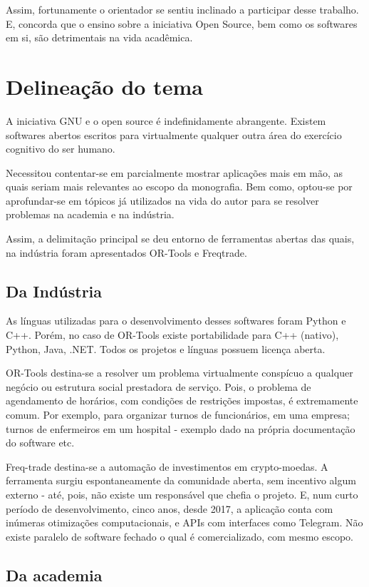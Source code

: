 \documentclass[
12pt,				%
openright,			%
oneside,			%
a4paper,			%
brazil,				%
english,			%
]{abntex2}
\begin{document}
Assim, fortunamente o orientador se sentiu inclinado a participar
desse trabalho. E, concorda que o ensino sobre a iniciativa Open
Source, bem como os softwares em si, são detrimentais na vida acadêmica.

\section{Delineação do tema}

A iniciativa GNU e o open source é indefinidamente abrangente. Existem
softwares abertos escritos para virtualmente qualquer outra área do
exercício cognitivo do ser humano.

Necessitou contentar-se em parcialmente mostrar aplicações mais em
mão, as quais seriam mais relevantes ao escopo da monografia. Bem
como, optou-se por aprofundar-se em tópicos já utilizados na vida do
autor para se resolver problemas na academia e na indústria.

Assim, a delimitação principal se deu entorno de ferramentas abertas
das quais, na indústria foram apresentados OR-Tools e
Freqtrade.

\subsection{Da Indústria}
As línguas utilizadas para o desenvolvimento desses softwares foram
Python e C++. Porém, no caso de OR-Tools existe portabilidade para
C++ (nativo), Python, Java, .NET. Todos os projetos e línguas possuem licença aberta.

OR-Tools destina-se a resolver um problema virtualmente
conspícuo a qualquer negócio ou estrutura social prestadora de
serviço. Pois, o problema de agendamento de horários, com condições de
restrições impostas, é extremamente comum. Por exemplo, para organizar
turnos de funcionários, em uma empresa; turnos de enfermeiros em um
hospital - exemplo dado na própria documentação do software etc.

Freq-trade destina-se a automação de investimentos em
crypto-moedas. A ferramenta surgiu espontaneamente da comunidade
aberta, sem incentivo algum externo - até, pois, não existe um
responsável que chefia o projeto. E, num curto período de
desenvolvimento, cinco anos, desde 2017, a aplicação conta com
inúmeras otimizações computacionais, e APIs com interfaces como
Telegram. Não existe paralelo de software fechado o qual é
comercializado, com mesmo escopo.

\subsection{Da academia}
\label{subsec:res-academia}
\end{document}
